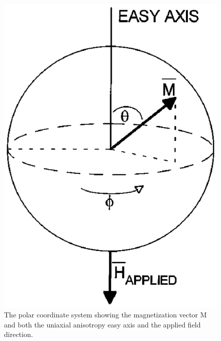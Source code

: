 {{		\begin{figure}[H]
			\begin{center}
				\includegraphics[scale=1]{me20b178/me20b178_1.eps}
			\end{center}
			\caption{The polar coordinate system showing the magnetization vector M and both the uniaxial anisotropy easy axis and the applied field direction.}
			\label{fig:magnetic_precession} 
		\end{figure}

}}
